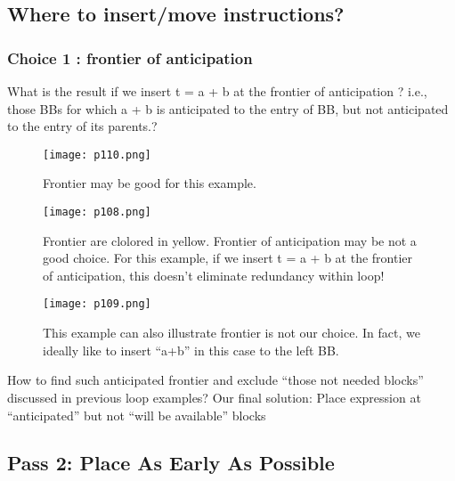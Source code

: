 \subsection{Where to insert/move instructions?}

\subsubsection{Choice 1 : frontier of anticipation}




What is the result if we insert t = a + b at the frontier of anticipation ?
i.e., those BBs for which a + b is anticipated to the entry of BB, but not anticipated
to the entry of its parents.?


\begin{figure}[H]
	\centering
	\texttt{[image: p110.png]}
	\caption{Frontier may be good for this example.}
	\label{fig:p110}
\end{figure}

\begin{figure}[H]
	\centering
	\texttt{[image: p108.png]}
	\caption{Frontier are clolored in yellow. Frontier of anticipation may be not a good choice. For this example,
		if we insert t = a + b at the frontier of anticipation, this doesn't eliminate redundancy within loop!}
	\label{fig:p108}
\end{figure}



\begin{figure}[H]
	\centering
	\texttt{[image: p109.png]}
	\caption{This example can also illustrate frontier is not our choice. In fact, we ideally like to insert “a+b” in this case to the left BB.}
	\label{fig:p109}
\end{figure}


How to find such anticipated frontier and exclude “those not
needed blocks” discussed in previous loop examples? Our final solution:
Place expression at “anticipated” but not “will be
available” blocks

\subsection{Pass 2: Place As Early As Possible}


